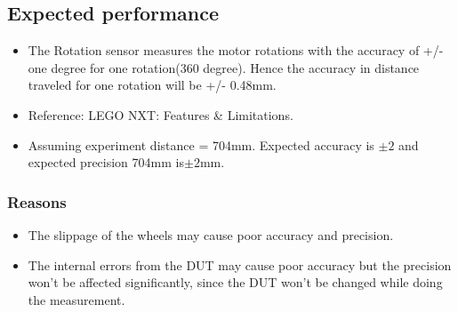 \documentclass[11pt,a4paper,titlepage]{article}
\begin{document}
\subsection{\textbf{Expected performance}}
\begin{itemize}
\item The Rotation sensor measures the motor rotations with the accuracy of +/- one degree for one rotation(360 degree). Hence the accuracy in distance traveled for one rotation will be +/- 0.48mm. 
\item Reference: LEGO NXT: Features \& Limitations.
\item Assuming experiment distance = 704mm. Expected accuracy is $ \pm 2$ and expected precision 704mm is$ \pm 2$mm.
\end{itemize}


\subsubsection{Reasons}
\begin{itemize}
\item The slippage of the wheels may cause poor accuracy and precision.
\item The internal errors from the DUT may cause poor accuracy but the precision won't be affected significantly, since the DUT won't be changed while doing the measurement.
\end{itemize}
\end{document}
